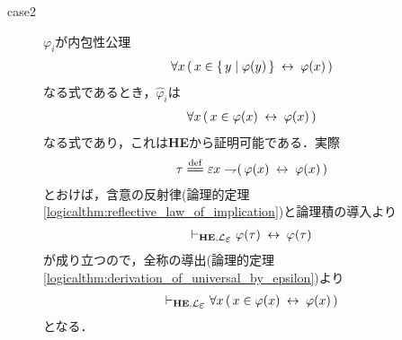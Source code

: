 \begin{metaprf}
\begin{description}
			\item[case2] $\varphi_{i}$が内包性公理
				\begin{align}
					\forall x\, (\, x \in \{\, y \mid \varphi(y)\, \} \hspace{0.25em}\leftrightarrow\hspace{0.25em} \varphi(x)\, )
				\end{align}
				なる式であるとき，$\widehat{\varphi}_{i}$は
				\begin{align}
					\forall x\, (\, x \in \varphi(x) \hspace{0.25em}\leftrightarrow\hspace{0.25em} \varphi(x)\, )
				\end{align}
				なる式であり，これは{\bf HE}から証明可能である．実際
				\begin{align}
					\tau \defeq \varepsilon x \negation (\, \varphi(x) \lrarrow \varphi(x)\, )
				\end{align}
				とおけば，含意の反射律(論理的定理\ref{logicalthm:reflective_law_of_implication})と論理積の導入より
				\begin{align}
					\provable{\mbox{{\bf HE}},\lang{\varepsilon}} \varphi(\tau) \lrarrow \varphi(\tau)
				\end{align}
				が成り立つので，全称の導出(論理的定理\ref{logicalthm:derivation_of_universal_by_epsilon})より
				\begin{align}
					\provable{\mbox{{\bf HE}},\lang{\varepsilon}} \forall x\, (\, x \in \varphi(x) \lrarrow \varphi(x)\, )
				\end{align}
				となる．
			

\end{description}
\end{metaprf}
